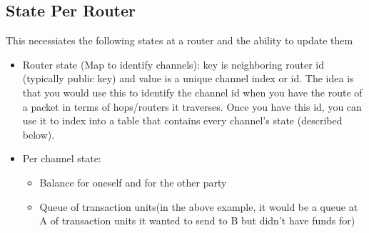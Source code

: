 \documentclass[a4paper]{article}
\newcommand{\TUs}{transaction units\xspace}
\begin{document}
\subsection{State Per Router}
This necessiates the following states at a router and the ability to update them
\begin{itemize}
    \item Router state (Map to identify channels): key is neighboring router id (typically public key) and value is a unique channel index or id. 
        The idea is that you would use this to identify the channel id when you have the route of a packet in terms of hops/routers it traverses. Once you have this id,
        you can use it to index into a table that contains every channel's state (described below).
    \item Per channel state:
        \begin{itemize}
            \item Balance for oneself and for the other party
            \item Queue of \TUs (in the above example, it would be a queue at A of \TUs it wanted to send to B but didn't have funds for)
      \end{itemize}
\end{itemize}
\end{document}
